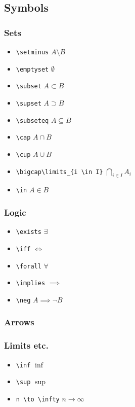 \documentclass[a4paper]{article}
\begin{document}
\subsection{Symbols}

\subsubsection{Sets}

\begin{itemize}
	\item \verb|\setminus| \quad $A \setminus B$
	\item \verb|\emptyset| \quad $\emptyset$
	\item \verb|\subset| \quad $A \subset B$
	\item \verb|\supset| \quad $A \supset B$
	\item \verb|\subseteq| \quad $A \subseteq B$
	\item \verb|\cap| \quad $A \cap B$
	\item \verb|\cup| \quad $A \cup B$
	\item \verb|\bigcap\limits_{i \in I}| \quad $\bigcap\limits_{i \in I} A_i$
	\item \verb|\in| \quad $A \in B$
\end{itemize}


\subsubsection{Logic}

\begin{itemize}
	\item \verb|\exists| \quad $\exists$
	\item \verb|\iff| \quad $\iff$
	\item \verb|\forall| \quad $\forall$
	\item \verb|\implies| \quad $\implies$
	\item \verb|\neg| \quad $A \implies \neg B$
\end{itemize}

\subsubsection{Arrows}


\subsubsection{Limits etc.}

\begin{itemize}
	\item \verb|\inf| $\inf$
	\item \verb|\sup| $\sup$
	\item \verb|n \to \infty| $n \to \infty$
\end{itemize}
\end{document}
